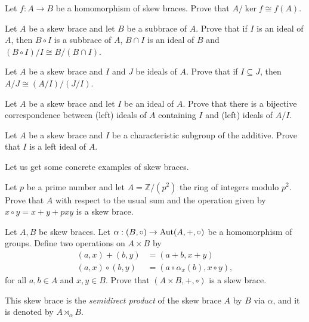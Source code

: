 \documentclass[12pt]{amsproc}
\begin{document}
\begin{xca}\label{ex:thmiso1}
    Let $f : A\to B$ be a homomorphism of skew braces. Prove that $A/\ker f \cong f(A)$.
\end{xca}

\begin{xca}\label{ex:thmiso2}
    Let $A$ be a skew brace and let $B$ be a subbrace of $A$. Prove that if $I$ is an ideal of $A$, then $B\circ I$ is a subbrace of $A$, $B\cap I$ is an ideal of $B$ and $(B\circ I)/I \cong B/(B\cap I)$.
\end{xca}

\begin{xca}\label{ex:thmiso3}
    Let $A$ be a skew brace and $I$ and $J$ be ideals of $A$. Prove that if $I\subseteq J$, then $A/J\cong (A/I)/(J/I)$.
\end{xca}

\begin{xca}\label{ex:thmiso4}
    Let $A$ be a skew brace and let $I$ be an ideal of $A$. Prove that there is a bijective correspondence between (left) ideals of $A$ containing $I$ and (left) ideals of $A/I$.
\end{xca}

\begin{xca}
    Let $A$ be a skew brace and $I$ be a characteristic subgroup of the additive. Prove that $I$ is a left ideal of $A$.
\end{xca}

Let us get some concrete examples of skew braces.

\begin{xca}
    Let $p$ be a prime number and let  $A=\mathbb{Z}/(p^2)$ the ring of integers modulo $p^2$. Prove that $A$ with respect to the usual sum and the operation given by $x \circ y = x+y+pxy$ is a skew brace.
\end{xca}

\begin{xca}
    Let $A,B$ be skew braces. 
    Let $\alpha: (B,\circ)\to\operatorname{Aut}(A,+,\circ)$ be a homomorphism of groups. 
    Define two operations on $A\times B$ by
    \begin{align*}
        (a,x)+(b,y) &= (a+b,x+y)\\
        (a,x)\circ(b,y) &= (a\circ\alpha_{x}(b), x\circ y),
    \end{align*}
    for all $a,b\in A$ and $x,y\in B$. Prove that $(A\times B, +,\circ)$ is a skew brace. 
    
    This skew brace is the \emph{semidirect product} of the skew brace $A$ by $B$ via $\alpha$, and it is denoted by $A\rtimes_{\alpha}B$.
\end{xca}
\end{document}
